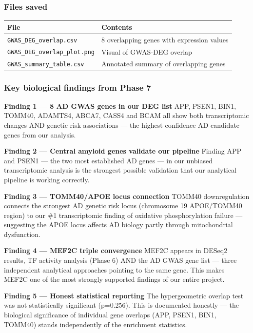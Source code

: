 \documentclass[
]{article}
\begin{document}
\subsubsection{Files saved}\label{files-saved-4}

\begin{longtable}[]{@{}ll@{}}
\toprule\noalign{}
File & Contents \\
\midrule\noalign{}
\endhead
\bottomrule\noalign{}
\endlastfoot
\texttt{GWAS\_DEG\_overlap.csv} & 8 overlapping genes with expression
values \\
\texttt{GWAS\_DEG\_overlap\_plot.png} & Visual of GWAS-DEG overlap \\
\texttt{GWAS\_summary\_table.csv} & Annotated summary of overlapping
genes \\
\end{longtable}

\subsubsection{Key biological findings from Phase
7}\label{key-biological-findings-from-phase-7}

\textbf{Finding 1 --- 8 AD GWAS genes in our DEG list} APP, PSEN1, BIN1,
TOMM40, ADAMTS4, ABCA7, CASS4 and BCAM all show both transcriptomic
changes AND genetic risk associations --- the highest confidence AD
candidate genes from our analysis.

\textbf{Finding 2 --- Central amyloid genes validate our pipeline}
Finding APP and PSEN1 --- the two most established AD genes --- in our
unbiased transcriptomic analysis is the strongest possible validation
that our analytical pipeline is working correctly.

\textbf{Finding 3 --- TOMM40/APOE locus connection} TOMM40
downregulation connects the strongest AD genetic risk locus (chromosome
19 APOE/TOMM40 region) to our \#1 transcriptomic finding of oxidative
phosphorylation failure --- suggesting the APOE locus affects AD biology
partly through mitochondrial dysfunction.

\textbf{Finding 4 --- MEF2C triple convergence} MEF2C appears in DESeq2
results, TF activity analysis (Phase 6) AND the AD GWAS gene list ---
three independent analytical approaches pointing to the same gene. This
makes MEF2C one of the most strongly supported findings of our entire
project.

\textbf{Finding 5 --- Honest statistical reporting} The hypergeometric
overlap test was not statistically significant (p=0.256). This is
documented honestly --- the biological significance of individual gene
overlaps (APP, PSEN1, BIN1, TOMM40) stands independently of the
enrichment statistics.
\end{document}
